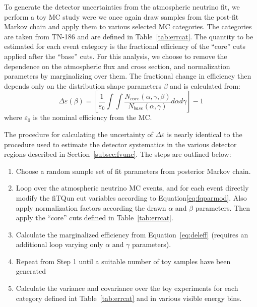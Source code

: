 To generate the detector uncertainties from the atmospheric neutrino fit, we
perform a toy MC study were we once again draw samples from the post-fit Markov
chain and apply them to various selected MC categories.  The categories are
taken from TN-186 and are defined in Table~\ref{tab:errcat}. The quantity to
be estimated for each event category is the fractional efficiency of the ``core''
cuts applied after the ``base'' cuts.  For this analysis, we choose to remove the 
dependence on the atmospheric flux and cross section, and normalization parameters by 
marginalizing over them.  The fractional change in efficiency then depends only
on the distribution shape parameters $\beta$ and is calculated from:
%
\begin{equation}
  \label{eq:deleff}
  \Delta \varepsilon(\beta) = \left[ \frac{1}{\varepsilon_{0}}
  \int\int\frac{N_{core}(\alpha,\gamma,\beta)}{N_{base}(\alpha,\gamma)}d\alpha d\gamma \right] - 1
\end{equation}
%
where $\varepsilon_{0}$ is the nominal efficiency from the MC.

The procedure for calculating the uncertainty of $\Delta \varepsilon$ is nearly
identical to the procedure used to estimate the detector systematics in the various
detector regions described in Section~\ref{subsec:fvunc}. The steps are outlined
below:

\begin{enumerate}
  \item Choose a random sample set of fit parameters from posterior Markov chain.
  \item Loop over the atmospheric neutrino MC events, and for each event directly modify the fiTQun cut variables
    according to Equation\ref{eq:fqparmod}. Also apply normalization factors according the drawn $\alpha$ and
    $\beta$ parameters.  Then apply the ``core'' cuts defined in Table~\ref{tab:errcat}.
  \item Calculate the marginalized efficiency from Equation~\ref{eq:deleff} (requires an additional
    loop varying only $\alpha$ and $\gamma$ parameters).
  \item Repeat from Step 1 until a suitable number of toy samples have been generated
  \item Calculate the variance and covariance over the toy experiments for each category defined
    int Table~\ref{tab:errcat} and in various visible energy bins.
\end{enumerate}

